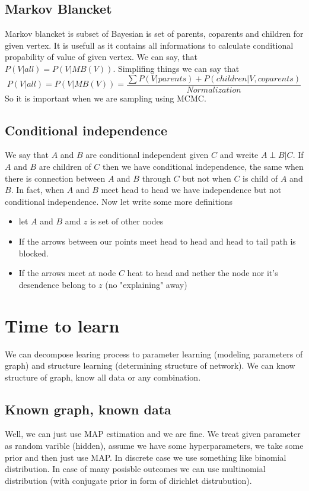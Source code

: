 \documentclass[12pt,a4paper]{article}
\begin{document}
\subsection{Markov Blancket}
Markov blancket is subset of Bayesian is set of parents, coparents and children for given vertex. It is usefull as it contains all informations to calculate conditional propability of
value of given vertex. We can say, that $P(V| all)=P(V|MB(V))$. Simplifing things we can say that
\begin{equation}
    P(V|all)=P(V|MB(V))=\frac{\sum P(V|parents)+P(children|V,coparents)}{Normalization}
\end{equation}
So it is important when we are sampling using MCMC. 
\subsection{Conditional independence}
We say that $A$ and $B$ are conditional independent given $C$ and wreite $A \perp B |C$. If $A$ and $B$ are children of $C$ then we have conditional independence, the same
when there is connection between $A$ and $B$ through $C$ but not when $C$ is child of $A$ and $B$. In fact, when $A$ and $B$ meet head to head we have independence but not conditional independence.
Now let write some more definitions
\begin{itemize}
    \item let $A$ and $B$ amd $z$ is set of other nodes
    \item If the arrows between our points meet head to head and head to tail path is blocked.
    \item If the arrows meet at node $C$ heat to head and nether the node nor it's desendence belong to $z$ (no "explaining" away)
\end{itemize}
\section{Time to learn}
We can decompose learing process to parameter learning (modeling parameters of graph) and structure learning (determining structure of network).
We can know structure of graph, know all data or any combination.
\subsection{Known graph, known data}
Well, we can just use MAP estimation and we are fine. We treat given parameter as random varible (hidden), assume we have some hyperparameters, we take some prior and then just use MAP.
In discrete case we use something like binomial distribution. In case of many posisble outcomes we can use multinomial distribution (with conjugate prior in form of dirichlet distrubution).
\end{document}

